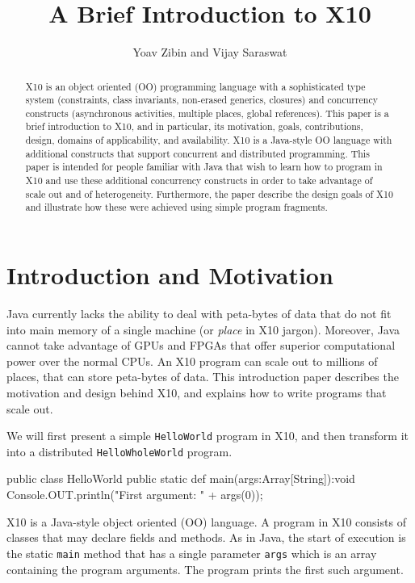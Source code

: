 \documentclass[a4paper]{article}
\title{A Brief Introduction to X10}
\author{Yoav Zibin and Vijay Saraswat}
\date{}
\def\codesmaller{\small}
\newcommand{\code}[1]{\texttt{\textup{\codesmaller #1}}}
\begin{document}
\maketitle


\begin{abstract}
X10 is an object oriented (OO) programming language with a sophisticated
    type system (constraints, class invariants, non-erased generics, closures)
    and concurrency constructs (asynchronous activities, multiple places, global references).
This paper is a brief introduction to X10, and in particular,
    its motivation, goals,
    contributions, design, domains of applicability, and availability.
X10 is a Java-style OO language with additional constructs that support concurrent and distributed programming.
This paper is intended for people familiar with Java that wish to learn how to program in X10
    and use these additional concurrency constructs in order to take advantage of scale out and of heterogeneity.
Furthermore, the paper describe the design goals of X10 and illustrate how these were achieved
    using simple program fragments.
\end{abstract}

\section{Introduction and Motivation}
Java currently lacks the ability to deal with peta-bytes of data
    that do not fit into main memory of a single machine (or \emph{place} in X10 jargon).
Moreover, Java cannot take advantage of GPUs and FPGAs that offer superior
    computational power over the normal CPUs.
An X10 program can scale out to millions of places, that can store peta-bytes of data.
This introduction paper describes the motivation and design behind X10,
    and explains how to write programs that scale out.

We will first present a simple \code{HelloWorld} program in X10,
    and then transform it into a distributed \code{HelloWholeWorld} program.

\begin{xten}
public class HelloWorld {
  public static def main(args:Array[String]):void {
     Console.OUT.println("First argument: " + args(0));
  }
}
\end{xten}
X10 is a Java-style object oriented (OO) language.
A program in X10 consists of classes that may
    declare fields and methods.
As in Java, the start of execution is the static \code{main} method
    that has a single parameter \code{args} which is an array containing the program arguments.
The program prints the first such argument.
\end{document}
